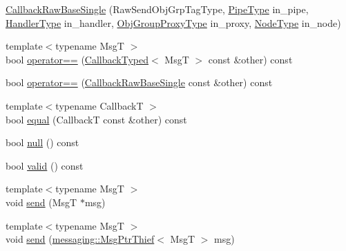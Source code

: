 \begin{DoxyCompactItemize}
\item 
\hyperlink{structvt_1_1pipe_1_1callback_1_1cbunion_1_1_callback_raw_base_single_a8db688e82d3fb4d8f7f0a37817a0d929}{Callback\+Raw\+Base\+Single} (Raw\+Send\+Obj\+Grp\+Tag\+Type, \hyperlink{namespacevt_ac9852acda74d1896f48f406cd72c7bd3}{Pipe\+Type} in\+\_\+pipe, \hyperlink{namespacevt_af64846b57dfcaf104da3ef6967917573}{Handler\+Type} in\+\_\+handler, \hyperlink{namespacevt_ad7cae989df485fccca57f0792a880a8e}{Obj\+Group\+Proxy\+Type} in\+\_\+proxy, \hyperlink{namespacevt_a866da9d0efc19c0a1ce79e9e492f47e2}{Node\+Type} in\+\_\+node)
\item 
{\footnotesize template$<$typename MsgT $>$ }\\bool \hyperlink{structvt_1_1pipe_1_1callback_1_1cbunion_1_1_callback_raw_base_single_a0ed7e09c29d285f662731495b0a61ad0}{operator==} (\hyperlink{structvt_1_1pipe_1_1callback_1_1cbunion_1_1_callback_typed}{Callback\+Typed}$<$ MsgT $>$ const \&other) const
\item 
bool \hyperlink{structvt_1_1pipe_1_1callback_1_1cbunion_1_1_callback_raw_base_single_a875b9abe53b942d1e432beec980359e0}{operator==} (\hyperlink{structvt_1_1pipe_1_1callback_1_1cbunion_1_1_callback_raw_base_single}{Callback\+Raw\+Base\+Single} const \&other) const
\item 
{\footnotesize template$<$typename CallbackT $>$ }\\bool \hyperlink{structvt_1_1pipe_1_1callback_1_1cbunion_1_1_callback_raw_base_single_a5a2b870d980afbeb12ff2b708028cddc}{equal} (CallbackT const \&other) const
\item 
bool \hyperlink{structvt_1_1pipe_1_1callback_1_1cbunion_1_1_callback_raw_base_single_a69279b16198da6a06c5cfb28203c9819}{null} () const
\item 
bool \hyperlink{structvt_1_1pipe_1_1callback_1_1cbunion_1_1_callback_raw_base_single_ae71a381a339f3e46adea8f93a6726bd5}{valid} () const
\item 
{\footnotesize template$<$typename MsgT $>$ }\\void \hyperlink{structvt_1_1pipe_1_1callback_1_1cbunion_1_1_callback_raw_base_single_a4b09f1ec8917085ba9934764c16b29d6}{send} (MsgT $\ast$msg)
\item 
{\footnotesize template$<$typename MsgT $>$ }\\void \hyperlink{structvt_1_1pipe_1_1callback_1_1cbunion_1_1_callback_raw_base_single_aee3d6fded0273cf2f0e653e20a91bbc1}{send} (\hyperlink{structvt_1_1messaging_1_1_msg_ptr_thief}{messaging\+::\+Msg\+Ptr\+Thief}$<$ MsgT $>$ msg)
\item 

\end{DoxyCompactItemize}

